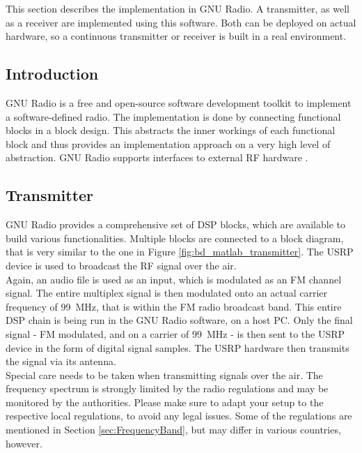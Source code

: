 This section describes the implementation in GNU Radio.
A transmitter, as well as a receiver are implemented using this software.
Both can be deployed on actual hardware, so a continuous transmitter or receiver is built in a real environment.

\subsection{Introduction}

GNU Radio is a free and open-source software development toolkit to implement a software-defined radio.
The implementation is done by connecting functional blocks in a block design.
This abstracts the inner workings of each functional block and thus provides an implementation approach on a very high level of abstraction.
GNU Radio supports interfaces to external RF hardware \cite{SoftwareGnuRadio}.

\subsection{Transmitter}

GNU Radio provides a comprehensive set of DSP blocks, which are available to build various functionalities.
Multiple blocks are connected to a block diagram, that is very similar to the one in Figure \ref{fig:bd_matlab_transmitter}.
The USRP device is used to broadcast the RF signal over the air.\\

Again, an audio file is used as an input, which is modulated as an FM channel signal.
The entire multiplex signal is then modulated onto an actual carrier frequency of 99~MHz, that is within the FM radio broadcast band.
This entire DSP chain is being run in the GNU Radio software, on a host PC.
Only the final signal - FM modulated, and on a carrier of 99~MHz - is then sent to the USRP device in the form of digital signal samples.
The USRP hardware then transmits the signal via its antenna.\\

Special care needs to be taken when transmitting signals over the air.
The frequency spectrum is strongly limited by the radio regulations and may be monitored by the authorities.
Please make sure to adapt your setup to the respective local regulations, to avoid any legal issues.
Some of the regulations are mentioned in Section \ref{sec:FrequencyBand}, but may differ in various countries, however.\\

